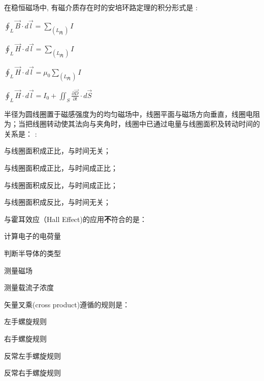 \documentclass{njustexam}
\begin{document}
\begin{problem}
  在稳恒磁场中, 有磁介质存在时的安培环路定理的积分形式是 : 
  \begin{abcd}
    \item  $\oint_L \vec{B} \cdot d \vec{l}=\sum_{\left(L_{\text {内 }}\right)} I$
    \item  $\oint_L \vec{H} \cdot d \vec{l}=\sum_{\left(L_{\text {内 }}\right)} I$
    \item  $\oint_L \vec{H} \cdot d \vec{l}=\mu_0 \sum_{\left(L_{\text {内 }}\right)} I$
    \item  $\oint_L \vec{H} \cdot d \vec{l}=I_0+\iint_S \frac{\partial \vec{D}}{\partial t} \cdot d \vec{S}$
  \end{abcd}

\end{problem}


\begin{problem}
  半径为圆线圈置于磁感强度为的均匀磁场中，线圈平面与磁场方向垂直，线圈电阻为；当把线圈转动使其法向与夹角时，线圈中已通过电量与线圈面积及转动时间的关系是： 
: 
  \begin{abcd}
    \item  与线圈面积成正比，与时间无关； 
    \item  与线圈面积成正比，与时间成正比；
    \item  与线圈面积成反比，与时间成正比；
    \item  与线圈面积成反比，与时间无关；
  \end{abcd}

\end{problem}




\begin{problem}

    与霍耳效应（Hall Effect)的应用\textbf{不}符合的是：
    \begin{abcd}
      \item 计算电子的电荷量
      \item 判断半导体的类型
      \item 测量磁场
      \item 测量载流子浓度
    \end{abcd}
\end{problem}


\begin{problem}

  矢量叉乘(cross product)遵循的规则是：
  \begin{abcd}
    \item 左手螺旋规则
    \item 右手螺旋规则
    \item 反常左手螺旋规则
    \item 反常右手螺旋规则
  \end{abcd}
\end{problem}
\end{document}
